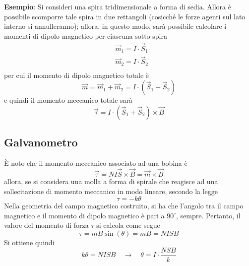 \documentclass[a4paper]{extarticle}
\begin{document}
\vspace{1em}
\noindent
\textbf{Esempio}: Si consideri una spira tridimensionale a forma di sedia. Allora è possibile scomporre tale spira in due rettangoli (cosicché le forze agenti sul lato interno si annulleranno); allora, in questo modo, sarà possibile calcolare i momenti di dipolo magnetico per ciascuna sotto-spira
\begin{align*}
  &\vec{m}_1=I \cdot \vec{S}_1\\
  &\vec{m}_2=I \cdot \vec{S}_2\\
\end{align*}
per cui il momento di dipolo magnetico totale è
\[\vec m = \vec{m}_1 + \vec{m}_2 = I \cdot (\vec{S}_1 + \vec{S}_2)\]
e quindi il momento meccanico totale sarà
\[\vec \tau = I \cdot (\vec{S}_1 + \vec{S}_2) \times \vec B\]

\vspace{1em}
\subsection{Galvanometro}
È noto che il momento meccanico associato ad una bobina è
\[\vec \tau = N I \vec S \times \vec B = \vec m \times \vec B\]
allora, se si considera una molla a forma di spirale che reagisce ad una sollecitazione di momento meccanico in modo lineare, secondo la legge
\[\tau = - k \theta\]
Nella geometria del campo magnetico costruito, si ha che l'angolo tra il campo magnetico e il momento di dipolo magnetico è pari a $90^\circ$, sempre. Pertanto, il valore del momento di forza $\tau$ si calcola come segue
\[\tau = m B \sin(\theta) = m B =  NIS B\]
Si ottiene quindi
\[k \theta = NIS B \hspace{1em} \rightarrow \hspace{1em} \theta = I \cdot \dfrac{NSB}{k}\]

\vspace{1em}
\end{document}
